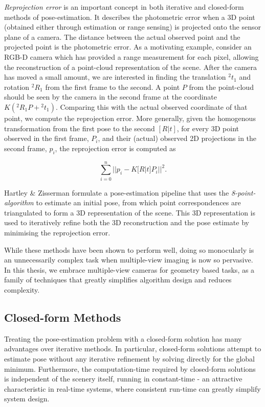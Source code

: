 \textit{Reprojection error} is an important concept in both iterative and closed-form methods of pose-estimation. It describes the photometric error when a 3D point (obtained either through estimation or range sensing) is projected onto the sensor plane of a camera. The distance between the actual observed point and the projected point is the photometric error. As a motivating example, consider an RGB-D camera which has provided a range measurement for each pixel, allowing the reconstruction of a point-cloud representation of the scene. After the camera has moved a small amount, we are interested in finding the translation $^2t_1$ and rotation $^2R_1$ from the first frame to the second. A point $P$ from the point-cloud should be seen by the camera in the second frame at the coordinate $K({^2R_1P} + {^2t_1})$. Comparing this with the actual observed coordinate of that point, we compute the reprojection error. More generally, given the homogenous transformation from the first pose to the second $[R|t]$, for every 3D point observed in the first frame, $P_i$, and their (actual) observed 2D projections in the second frame, $p_i$, the reprojection error is computed as 


$$ \sum_{i=0}^{n}{|| p_i - K [R | t] {P_i} ||^2}.$$

Hartley \& Zisserman \cite{zisserman2004multiview} formulate a pose-estimation pipeline that uses the \textit{8-point-algorithm} to estimate an initial pose, from which point correspondences are triangulated to form a 3D representation of the scene. This 3D representation is used to iteratively refine both the 3D reconstruction and the pose estimate by minimising the reprojection error. 

While these methods have been shown to perform well, doing so monocularly is an unnecessarily complex task when multiple-view imaging is now so pervasive. In this thesis, we embrace multiple-view cameras for geometry based tasks, as a family of techniques that greatly simplifies algorithm design and reduces complexity.


\subsection{Closed-form Methods}

Treating the pose-estimation problem with a closed-form solution has many advantages over iterative methods. In particular, closed-form solutions attempt to estimate pose without any iterative refinement by solving directly for the global minimum. Furthermore, the computation-time required by closed-form solutions is independent of the scenery itself, running in constant-time - an attractive characteristic in real-time systems, where consistent run-time can greatly simplify system design. 

